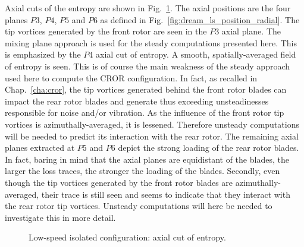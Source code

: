 Axial cuts of the entropy are shown in Fig.~\ref{fig:dream_ls_steady_entropy}.
The axial positions are the four planes $P3$, $P4$, $P5$
and $P6$ as defined in Fig.~\ref{fig:dream_ls_position_radial}.
The tip vortices generated by the front rotor are seen in the $P3$
axial plane. The mixing plane approach is used for the steady computations
presented here. This is emphasized by the $P4$ axial cut of entropy. A
smooth, spatially-averaged field of entropy is seen. This is of course the main
weakness of the steady approach used here to compute the CROR configuration.
In fact, as recalled in Chap.~\ref{cha:cror}, the tip vortices generated behind the
front rotor blades can impact the rear rotor blades and generate thus 
exceeding unsteadinesses responsible for noise and/or vibration. As the influence
of the front rotor tip vortices is azimuthally-averaged, it is
lessened. Therefore unsteady computations will be needed to
predict its interaction with the rear rotor.
The remaining axial planes extracted at $P5$ and $P6$ depict the strong loading
of the rear rotor blades. In fact, baring in mind that the
axial planes are equidistant of the blades, the larger the loss traces,
the stronger the loading of the blades. Secondly, even though the
tip vortices generated by the front rotor 
blades are azimuthally-averaged,
their trace is still seen and seems to indicate that they
interact with the rear rotor tip vortices. Unsteady computations will
here be needed to investigate this in more detail.
\begin{figure}[htp]
  \centering
  \caption{Low-speed isolated configuration: axial cut of entropy.}
   \label{fig:dream_ls_steady_entropy}
\end{figure}